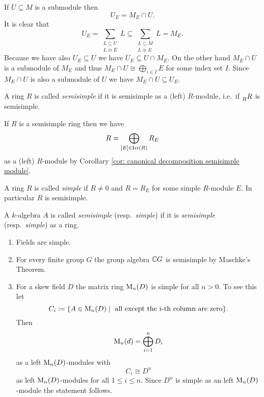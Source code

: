 \begin{rem}
\begin{enumerate}[label=\emph{\alph*)},leftmargin=*]
      If $U \subseteq M$ is a submodule then
      \[
        U_E = M_E \cap U.
      \]
      It is clear that
      \[
        U_E = \sum_{\substack{L \subseteq U \\ L \cong E}} L \subseteq \sum_{\substack{L \subseteq M \\ L \cong E}} L = M_E.
      \]
      Because we have also $U_E \subseteq U$ we have $U_E \subseteq U \cap M_E$. On the other hand $M_E \cap U$ is a submodule of $M_E$ and thus $M_E \cap U \cong \bigoplus_{i \in I} E$ for some index set $I$. Since $M_E \cap U$ is also a submodule of $U$ we have $M_E \cap U \subseteq U_E$.
  \end{enumerate}
\end{rem}


\begin{defi}
  A ring $R$ is called \emph{semisimple} if it is semisimple as a (left) $R$-module, i.e.\ if $\prescript{}{R}{R}$ is semisimple.
\end{defi}


If $R$ is a semisimple ring then we have
\[
  R = \bigoplus_{[E] \in \operatorname{Irr}(R)} R_E
\]
as a (left) $R$-module by Corollary \ref{cor: canonical decomposition semisimple module}.


\begin{defi}
  A ring $R$ is called \emph{simple} if $R \neq 0$ and $R = R_E$ for some simple $R$-module $E$. In particular $R$ is semisimple.
\end{defi}


\begin{defi}
  A $k$-algebra $A$ is called \emph{semisimple} (resp.\ \emph{simple}) if it is \emph{semisimple} (resp.\ \emph{simple}) as a ring.
\end{defi}


\begin{expls}
  \begin{enumerate}[label=\emph{\alph*)},leftmargin=*]
    \item
      Fields are simple.
    \item
      For every finite group $G$ the group algebra $\mathbb{C} G$ is semisimple by Maschke’s Theorem.
    \item
      For a skew field $D$ the matrix ring $\operatorname{M}_n(D)$ is simple for all $n > 0$. To see this let
      \[
        C_i
        \coloneqq \{ A \in \operatorname{M}_n(D) \mid \text{ all except the $i$-th column are zero} \}.
      \]
      Then
      \[
        \operatorname{M}_n(d) = \bigoplus_{i=1}^n D_i
      \]
      as a left $\operatorname{M}_n(D)$-modules with
      \[
        C_i \cong D^n
      \]
      as left $\operatorname{M}_n(D)$-modules for all $1 \leq i \leq n$. Since $D^n$ is simple as an left $\operatorname{M}_n(D)$-module the statement follows.
  \end{enumerate}
\end{expls}


